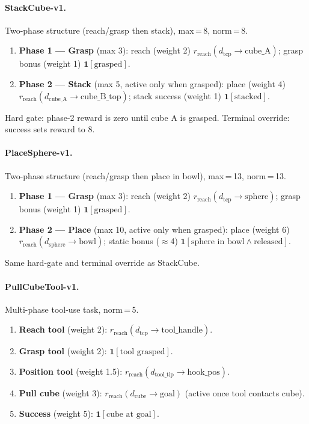 \documentclass{article}
\begin{document}
\paragraph{StackCube-v1.}
Two-phase structure (reach/grasp then stack), max\,=\,8, norm\,=\,8.
\begin{enumerate}
  \item \textbf{Phase 1 --- Grasp} (max 3):
    reach (weight 2) $r_\text{reach}(d_\text{tcp}{\to}\text{cube\_A})$;
    grasp bonus (weight 1) $\mathbf{1}[\text{grasped}]$.
  \item \textbf{Phase 2 --- Stack} (max 5, active only when grasped):
    place (weight 4) $r_\text{reach}(d_\text{cube\_A}{\to}\text{cube\_B\_top})$;
    stack success (weight 1) $\mathbf{1}[\text{stacked}]$.
\end{enumerate}
Hard gate: phase-2 reward is zero until cube A is grasped. Terminal override: success sets reward to 8.

\paragraph{PlaceSphere-v1.}
Two-phase structure (reach/grasp then place in bowl), max\,=\,13, norm\,=\,13.
\begin{enumerate}
  \item \textbf{Phase 1 --- Grasp} (max 3):
    reach (weight 2) $r_\text{reach}(d_\text{tcp}{\to}\text{sphere})$;
    grasp bonus (weight 1) $\mathbf{1}[\text{grasped}]$.
  \item \textbf{Phase 2 --- Place} (max 10, active only when grasped):
    place (weight 6) $r_\text{reach}(d_\text{sphere}{\to}\text{bowl})$;
    static bonus ($\approx$4) $\mathbf{1}[\text{sphere in bowl} \wedge \text{released}]$.
\end{enumerate}
Same hard-gate and terminal override as StackCube.

\paragraph{PullCubeTool-v1.}
Multi-phase tool-use task, norm\,=\,5.
\begin{enumerate}
  \item \textbf{Reach tool} (weight 2): $r_\text{reach}(d_\text{tcp}{\to}\text{tool\_handle})$.
  \item \textbf{Grasp tool} (weight 2): $\mathbf{1}[\text{tool grasped}]$.
  \item \textbf{Position tool} (weight 1.5): $r_\text{reach}(d_\text{tool\_tip}{\to}\text{hook\_pos})$.
  \item \textbf{Pull cube} (weight 3): $r_\text{reach}(d_\text{cube}{\to}\text{goal})$ (active once tool contacts cube).
  \item \textbf{Success} (weight 5): $\mathbf{1}[\text{cube at goal}]$.
\end{enumerate}
\end{document}
